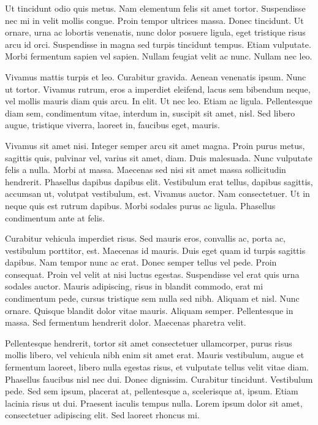 \documentclass[printmode]{mgr}
\begin{document}
Ut tincidunt odio quis metus. Nam elementum felis sit amet
tortor. Suspendisse nec mi in velit mollis congue. Proin tempor
ultrices massa. Donec tincidunt. Ut ornare, urna ac lobortis
venenatis, nunc dolor posuere ligula, eget tristique risus arcu id
orci. Suspendisse in magna sed turpis tincidunt tempus. Etiam
vulputate. Morbi fermentum sapien vel sapien. Nullam feugiat velit ac
nunc. Nullam nec leo.

Vivamus mattis turpis et leo. Curabitur gravida. Aenean venenatis
ipsum. Nunc ut tortor. Vivamus rutrum, eros a imperdiet eleifend,
lacus sem bibendum neque, vel mollis mauris diam quis arcu. In
elit. Ut nec leo. Etiam ac ligula. Pellentesque diam sem, condimentum
vitae, interdum in, suscipit sit amet, nisl. Sed libero augue,
tristique viverra, laoreet in, faucibus eget, mauris.

Vivamus sit amet nisi. Integer semper arcu sit amet magna. Proin purus
metus, sagittis quis, pulvinar vel, varius sit amet, diam. Duis
malesuada. Nunc vulputate felis a nulla. Morbi at massa. Maecenas sed
nisi sit amet massa sollicitudin hendrerit. Phasellus dapibus dapibus
elit. Vestibulum erat tellus, dapibus sagittis, accumsan ut, volutpat
vestibulum, est. Vivamus auctor. Nam consectetuer. Ut in neque quis
est rutrum dapibus. Morbi sodales purus ac ligula. Phasellus
condimentum ante at felis.

Curabitur vehicula imperdiet risus. Sed mauris eros, convallis ac,
porta ac, vestibulum porttitor, est. Maecenas id mauris. Duis eget
quam id turpis sagittis dapibus. Nam tempor nunc ac erat. Donec semper
tellus vel pede. Proin consequat. Proin vel velit at nisi luctus
egestas. Suspendisse vel erat quis urna sodales auctor. Mauris
adipiscing, risus in blandit commodo, erat mi condimentum pede, cursus
tristique sem nulla sed nibh. Aliquam et nisl. Nunc ornare. Quisque
blandit dolor vitae mauris. Aliquam semper. Pellentesque in massa. Sed
fermentum hendrerit dolor. Maecenas pharetra velit.

Pellentesque hendrerit, tortor sit amet consectetuer ullamcorper,
purus risus mollis libero, vel vehicula nibh enim sit amet
erat. Mauris vestibulum, augue et fermentum laoreet, libero nulla
egestas risus, et vulputate tellus velit vitae diam. Phasellus
faucibus nisl nec dui. Donec dignissim. Curabitur
tincidunt. Vestibulum pede. Sed sem ipsum, placerat at, pellentesque
a, scelerisque at, ipsum. Etiam lacinia risus ut dui. Praesent iaculis
tempus nulla. Lorem ipsum dolor sit amet, consectetuer adipiscing
elit. Sed laoreet rhoncus mi.
\end{document}
